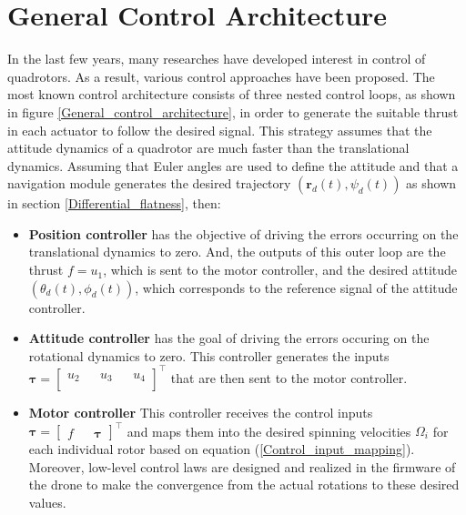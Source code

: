 \documentclass{thesisreport}
\begin{document}
\newpage 
 
 \section{General Control Architecture}
 In the last few years, many researches have developed interest in control of quadrotors. As a result, various control approaches have been proposed. The most known control architecture \cite{Faessler2018} consists of three nested control loops, as shown in figure \ref{General_control_architecture}, in order to generate the suitable thrust in each actuator to follow the desired signal. This strategy assumes that the attitude dynamics of a quadrotor are much faster than the translational dynamics. Assuming that Euler angles are used to define the attitude and that a navigation module generates the desired trajectory $(\bm{r}_d(t),\psi_d(t))$ as shown in section \ref{Differential_flatness}, then:
 
\begin{itemize}
	\setlength{\itemindent}{-.5in}
	\item [] \textbf{Position controller} has the objective of driving the errors occurring on the translational dynamics to zero.
		And, the outputs of this outer loop are the thrust $f=u_1$, which is sent to the motor controller, and the desired attitude $(\theta_d(t),\phi_d(t))$, which corresponds to the reference signal of the attitude controller.
	\item [] \textbf{Attitude controller} has the goal of driving the errors occuring on the rotational dynamics to zero. This controller generates the inputs 
	$\bm{\tau}=\begin{bmatrix}
	u_2 && u_3 && u_4 \\
	\end{bmatrix}^{\intercal}
	$
	that are then sent to the motor controller.
	\item [] \textbf{Motor controller} This controller receives the control inputs 	$\bm{\tau}=\begin{bmatrix}
	f && \bm{\tau}
	\end{bmatrix}^{\intercal}
	$ and maps them into the desired spinning velocities $\Omega_i$ for each individual rotor based on equation (\ref{Control_input_mapping}). Moreover, low-level control laws are designed and realized in the firmware of the drone to make the convergence from the actual rotations to these desired values.
\end{itemize}
 
\end{document}
